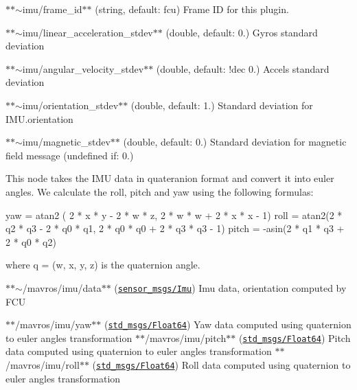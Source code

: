 \begin{DoxyItemize}
\item $\ast$$\ast${\ttfamily $\sim$imu/frame\+\_\+id}$\ast$$\ast$ (string, default\+: fcu) Frame ID for this plugin.
\item $\ast$$\ast${\ttfamily $\sim$imu/linear\+\_\+acceleration\+\_\+stdev}$\ast$$\ast$ (double, default\+: 0.) Gyro\textquotesingle{}s standard deviation
\item $\ast$$\ast${\ttfamily $\sim$imu/angular\+\_\+velocity\+\_\+stdev}$\ast$$\ast$ (double, default\+: !dec 0.) Accel\textquotesingle{}s standard deviation
\item $\ast$$\ast${\ttfamily $\sim$imu/orientation\+\_\+stdev}$\ast$$\ast$ (double, default\+: 1.) Standard deviation for I\+M\+U.\+orientation
\item $\ast$$\ast${\ttfamily $\sim$imu/magnetic\+\_\+stdev}$\ast$$\ast$ (double, default\+: 0.) Standard deviation for magnetic field message (undefined if\+: 0.)
\end{DoxyItemize}

This node takes the I\+MU data in quateranion format and convert it into euler angles. We calculate the roll, pitch and yaw using the following formulas\+:


\begin{DoxyCode}
yaw = atan2 ( 2 * x * y - 2 * w * z, 2 * w * w + 2 * x * x - 1)
roll = atan2(2 * q2 * q3 - 2 * q0 * q1, 2 * q0 * q0 + 2 * q3 * q3 - 1)
pitch = -asin(2 * q1 * q3 + 2 * q0 * q2)
\end{DoxyCode}
 where {\ttfamily q = (w, x, y, z)} is the quaternion angle.


\begin{DoxyItemize}
\item $\ast$$\ast${\ttfamily $\sim$/mavros/imu/data}$\ast$$\ast$ (\href{http://docs.ros.org/api/sensor_msgs/html/msg/Imu.html}{\tt sensor\+\_\+msgs/\+Imu}) Imu data, orientation computed by F\+CU
\end{DoxyItemize}


\begin{DoxyItemize}
\item $\ast$$\ast${\ttfamily /mavros/imu/yaw}$\ast$$\ast$ (\href{http://docs.ros.org/lunar/api/std_msgs/html/msg/Float64.html}{\tt std\+\_\+msgs/\+Float64}) Yaw data computed using quaternion to euler angles transformation $\ast$$\ast${\ttfamily /mavros/imu/pitch}$\ast$$\ast$ (\href{http://docs.ros.org/lunar/api/std_msgs/html/msg/Float64.html}{\tt std\+\_\+msgs/\+Float64}) Pitch data computed using quaternion to euler angles transformation $\ast$$\ast${\ttfamily /mavros/imu/roll}$\ast$$\ast$ (\href{http://docs.ros.org/lunar/api/std_msgs/html/msg/Float64.html}{\tt std\+\_\+msgs/\+Float64}) Roll data computed using quaternion to euler angles transformation
\end{DoxyItemize}

